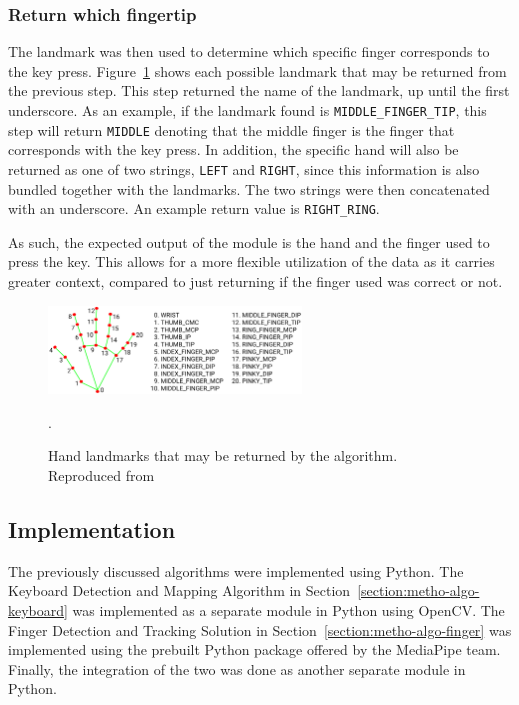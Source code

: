 \documentclass{report}
\begin{document}
\subsubsection{Return which fingertip}
The landmark was then used to determine which specific finger corresponds to the
key press. Figure~\ref{fig:metho-algo-integration-landmarks} shows each possible
landmark that may be returned from the previous step. This step returned the
name of the landmark, up until the first underscore. As an example, if the
landmark found is \texttt{MIDDLE\_FINGER\_TIP}, this step will return
\texttt{MIDDLE} denoting that the middle finger is the finger that corresponds
with the key press. In addition, the specific hand will also be returned as one
of two strings, \texttt{LEFT} and \texttt{RIGHT}, since this information is also
bundled together with the landmarks. The two strings were then concatenated with
an underscore. An example return value is \texttt{RIGHT\_RING}.

As such, the expected output of the module is the hand and the finger used to
press the key. This allows for a more flexible utilization of the data as it
carries greater context, compared to just returning if the finger used was
correct or not.

\begin{figure}[H]
	\centering
	\includegraphics[width=0.6\textwidth]{hand-landmarks.png}
	\caption{Hand landmarks that may be returned by the algorithm. Reproduced from }.
	\label{fig:metho-algo-integration-landmarks}
	\centering
\end{figure}

\subsection{Implementation}
\label{section:metho-algo-implementation}
The previously discussed algorithms were implemented using Python. The Keyboard
Detection and Mapping Algorithm in Section~\ref{section:metho-algo-keyboard} was
implemented as a separate module in Python using OpenCV. The Finger Detection
and Tracking Solution in Section~\ref{section:metho-algo-finger} was implemented
using the prebuilt Python package offered by the MediaPipe team. Finally, the
integration of the two was done as another separate module in Python.
\end{document}
